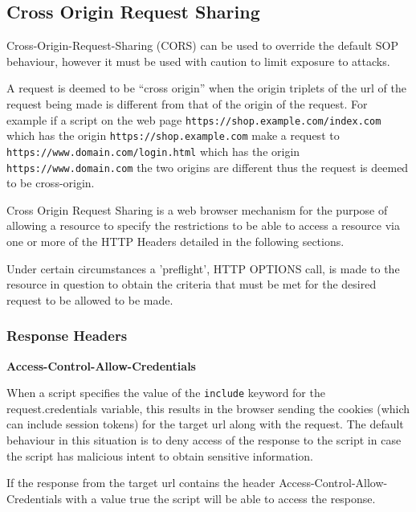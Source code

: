 \documentclass{mscreport}
\begin{document}
\subsection{Cross Origin Request Sharing}
\label{section:Cross-Origin-Request-Sharing}
Cross-Origin-Request-Sharing (CORS) can be used to override the default SOP behaviour, however it must be used with caution to limit exposure to attacks.

\vspace{0.3cm} \noindent
A request is deemed to be ``cross origin'' when the origin triplets of the url of the request being made is different from that of the origin of the request. For example if a script on the web page \texttt{https://shop.example.com/index.com} which has the origin \texttt{https://shop.example.com} make a request to \texttt{https://www.domain.com/login.html} which has the origin \texttt{https://www.domain.com} the two origins are different thus the request is deemed to be cross-origin.

\vspace{0.3cm} \noindent
Cross Origin Request Sharing is a web browser mechanism for the purpose of allowing a resource to specify the restrictions to be able to access a resource via one or more of the HTTP Headers \cite{Apple2006-hk} detailed in the following sections.

\vspace{0.3cm} \noindent
Under certain circumstances a 'preflight', HTTP OPTIONS call, is made to the resource in question to obtain the criteria that must be met for the desired request to be allowed to be made.

\subsubsection{Response Headers}

\textbf{Access-Control-Allow-Credentials}

\vspace{0.3cm} \noindent
When a script specifies the value of the \texttt{include} keyword for the request.credentials variable, this results in the browser sending the cookies (which can include session tokens) for the target url along with the request. The default behaviour in this situation is to deny access of the response to the script in case the script has malicious intent to obtain sensitive information.

\vspace{0.3cm} \noindent
If the response from the target url contains the header Access-Control-Allow-Credentials with a value true the script will be able to access the response.
\end{document}

